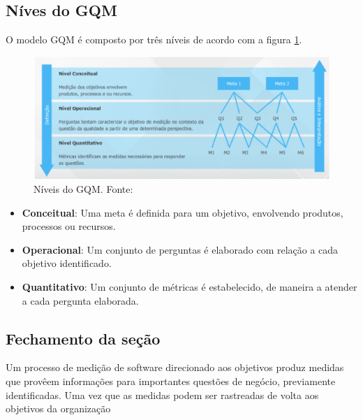 \subsection{Níves do GQM}

O modelo GQM é composto por três níveis de acordo com a figura \ref{fig:gqm1}.

\begin{figure}[h!]
	\centering
  \includegraphics[keepaspectratio=true,scale=0.5]{figuras/gqm.eps}
  \caption[Níveis do GQM.]{Níveis do GQM. Fonte: \cite{junior}}
	\label{fig:gqm1}
\end{figure}

\begin{itemize}
  \item \textbf{Conceitual}: Uma meta é definida para um objetivo, envolvendo produtos, processos ou recursos.
  \item \textbf{Operacional}: Um conjunto de perguntas é elaborado com relação a cada objetivo identificado.
  \item \textbf{Quantitativo}: Um conjunto de métricas é estabelecido, de maneira a atender a cada pergunta elaborada.
\end{itemize}

\subsection{Fechamento da seção}

Um processo de medição de software direcionado aos objetivos produz medidas que provêem informações para importantes questões de negócio, previamente identificadas. Uma vez que as medidas podem ser rastreadas de volta aos objetivos da organização \cite{junior}
